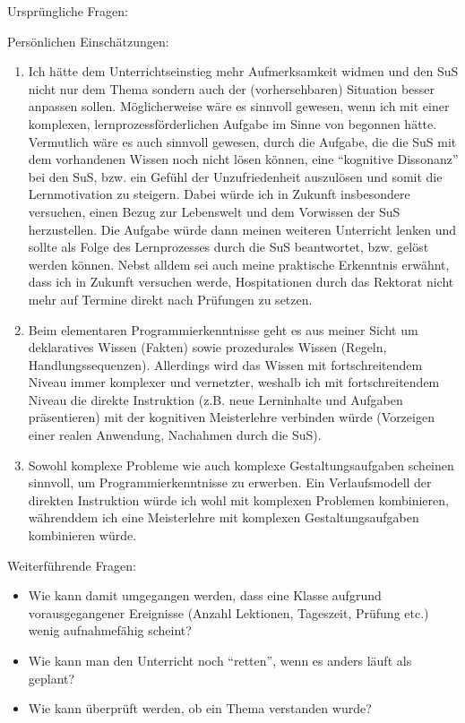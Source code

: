 \begin{myExBox}[title=Persönliche Beantwortung der Fragestellungen]
  Ursprüngliche Fragen:
  \fragestellungen

  Persönlichen Einschätzungen:
  \begin{enumerate}
    \item Ich hätte dem Unterrichtseinstieg mehr Aufmerksamkeit widmen und den SuS nicht nur dem Thema sondern auch der (vorhersehbaren) Situation besser anpassen sollen. Möglicherweise wäre es sinnvoll gewesen, wenn ich mit einer komplexen, lernprozessförderlichen Aufgabe im Sinne von \cite{tulo} begonnen hätte. Vermutlich wäre es auch sinnvoll gewesen, durch die Aufgabe, die die SuS mit dem vorhandenen Wissen noch nicht lösen können, eine \enquote{kognitive Dissonanz} bei den SuS, bzw. ein Gefühl der Unzufriedenheit auszulösen und somit die Lernmotivation zu steigern. Dabei würde ich in Zukunft insbesondere versuchen, einen Bezug zur Lebenswelt und dem Vorwissen der SuS herzustellen. Die Aufgabe würde dann meinen weiteren Unterricht lenken und sollte als Folge des Lernprozesses durch die SuS beantwortet, bzw. gelöst werden können. Nebst alldem sei auch meine praktische Erkenntnis erwähnt, dass ich in Zukunft versuchen werde, Hospitationen durch das Rektorat nicht mehr auf Termine direkt nach Prüfungen zu setzen.
    \item Beim elementaren Programmierkenntnisse geht es aus meiner Sicht um deklaratives Wissen (Fakten) sowie prozedurales Wissen (Regeln, Handlungssequenzen). Allerdings wird das Wissen mit fortschreitendem Niveau immer komplexer und vernetzter, weshalb ich mit fortschreitendem Niveau die direkte Instruktion (z.B. neue Lerninhalte und Aufgaben präsentieren) mit der kognitiven Meisterlehre verbinden würde (Vorzeigen einer realen Anwendung, Nachahmen durch die SuS).
    \item Sowohl komplexe Probleme wie auch komplexe Gestaltungsaufgaben scheinen sinnvoll, um Programmierkenntnisse zu erwerben. Ein Verlaufsmodell der direkten Instruktion würde ich wohl mit komplexen Problemen kombinieren, währenddem ich eine Meisterlehre mit komplexen Gestaltungsaufgaben kombinieren würde.
  \end{enumerate}
  Weiterführende Fragen:
  \begin{itemize}
    \item Wie kann damit umgegangen werden, dass eine Klasse aufgrund vorausgegangener Ereignisse (Anzahl Lektionen, Tageszeit, Prüfung etc.) wenig aufnahmefähig scheint?
    \item Wie kann man den Unterricht noch \enquote{retten}, wenn es anders läuft als geplant?
    \item Wie kann überprüft werden, ob ein Thema verstanden wurde?
  \end{itemize}


\end{myExBox}
